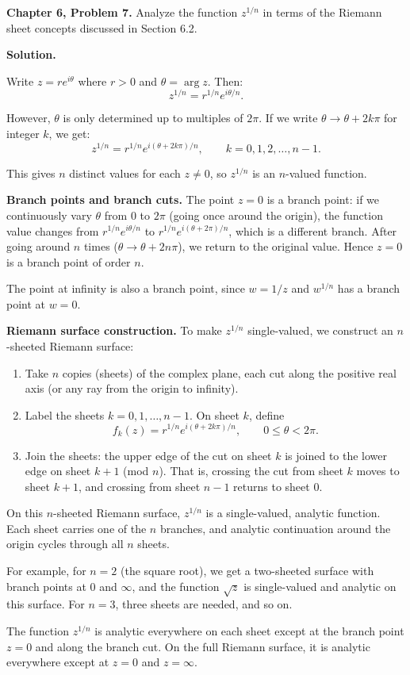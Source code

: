 \documentclass[12pt]{article}
\begin{document}
\textbf{Chapter 6, Problem 7.} Analyze the function $z^{1/n}$ in terms of the Riemann sheet concepts discussed in Section 6.2.

\bigskip
\textbf{Solution.}

Write $z = re^{i\theta}$ where $r > 0$ and $\theta = \arg z$. Then:
\[
z^{1/n} = r^{1/n} e^{i\theta/n}.
\]

However, $\theta$ is only determined up to multiples of $2\pi$. If we write $\theta \to \theta + 2k\pi$ for integer $k$, we get:
\[
z^{1/n} = r^{1/n} e^{i(\theta + 2k\pi)/n}, \qquad k = 0, 1, 2, \ldots, n-1.
\]

This gives $n$ distinct values for each $z \neq 0$, so $z^{1/n}$ is an $n$-valued function.

\textbf{Branch points and branch cuts.} The point $z = 0$ is a branch point: if we continuously vary $\theta$ from $0$ to $2\pi$ (going once around the origin), the function value changes from $r^{1/n}e^{i\theta/n}$ to $r^{1/n}e^{i(\theta+2\pi)/n}$, which is a different branch. After going around $n$ times ($\theta \to \theta + 2n\pi$), we return to the original value. Hence $z = 0$ is a branch point of order $n$.

The point at infinity is also a branch point, since $w = 1/z$ and $w^{1/n}$ has a branch point at $w = 0$.

\textbf{Riemann surface construction.} To make $z^{1/n}$ single-valued, we construct an $n$-sheeted Riemann surface:

\begin{enumerate}
\item Take $n$ copies (sheets) of the complex plane, each cut along the positive real axis (or any ray from the origin to infinity).

\item Label the sheets $k = 0, 1, \ldots, n-1$. On sheet $k$, define
\[
f_k(z) = r^{1/n} e^{i(\theta + 2k\pi)/n}, \qquad 0 \leq \theta < 2\pi.
\]

\item Join the sheets: the upper edge of the cut on sheet $k$ is joined to the lower edge on sheet $k+1$ (mod $n$). That is, crossing the cut from sheet $k$ moves to sheet $k+1$, and crossing from sheet $n-1$ returns to sheet $0$.
\end{enumerate}

On this $n$-sheeted Riemann surface, $z^{1/n}$ is a single-valued, analytic function. Each sheet carries one of the $n$ branches, and analytic continuation around the origin cycles through all $n$ sheets.

For example, for $n = 2$ (the square root), we get a two-sheeted surface with branch points at $0$ and $\infty$, and the function $\sqrt{z}$ is single-valued and analytic on this surface. For $n = 3$, three sheets are needed, and so on.

The function $z^{1/n}$ is analytic everywhere on each sheet except at the branch point $z = 0$ and along the branch cut. On the full Riemann surface, it is analytic everywhere except at $z = 0$ and $z = \infty$.
\end{document}
